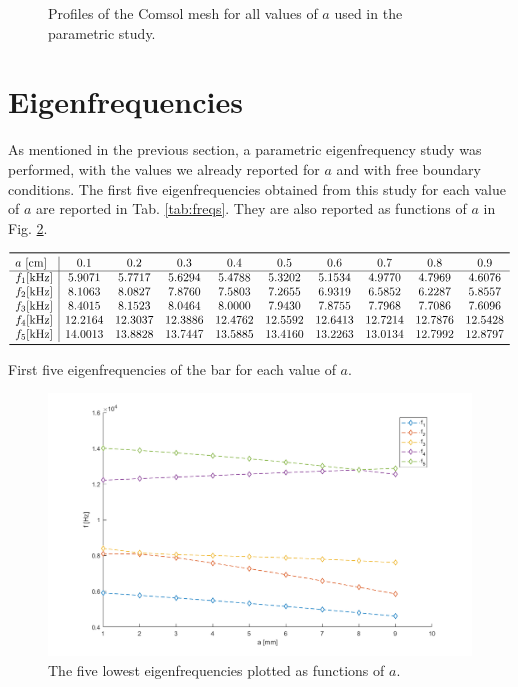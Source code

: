 \documentclass[a4paper]{article}
\begin{document}
\begin{figure}[h]
\begin{subfigure}{0.22\linewidth}
	\end{subfigure}
	\caption{Profiles of the Comsol mesh for all values of $a$ used in the parametric study.}
	\label{fig:mesh}
\end{figure}

\section{Eigenfrequencies}
As mentioned in the previous section, a parametric eigenfrequency study was performed, with the values we already reported for $a$ and with free boundary conditions. The first five eigenfrequencies obtained from this study for each value of $a$ are reported in Tab. \ref{tab:freqs}. They are also reported as functions of $a$ in Fig. \ref{fig:freqz}.

\begin{table}[h]
	\centering
	$\begin{array}{l|ccccccccc}
		\toprule
		 a~[\si{\centi\meter}] & 0.1 & 0.2 & 0.3 & 0.4 & 0.5 & 0.6 & 0.7 & 0.8 & 0.9\\
		 \hline
		 f_1[\si{\kilo\hertz}]&5.9071  &  5.7717  &  5.6294  &  5.4788   & 5.3202 &   5.1534  &  4.9770  &  4.7969   & 4.6076\\
		 f_2[\si{\kilo\hertz}]&8.1063   & 8.0827 &   7.8760  &  7.5803  &  7.2655 &   6.9319  &  6.5852  &  6.2287 &   5.8557\\
		 f_3[\si{\kilo\hertz}]&8.4015  &  8.1523  &  8.0464  &  8.0000  &  7.9430 &   7.8755 &   7.7968  &  7.7086 &   7.6096\\
		 f_4[\si{\kilo\hertz}]&12.2164 &  12.3037 &  12.3886  & 12.4762 &  12.5592 &  12.6413 &  12.7214  & 12.7876 &   12.5428\\
		 f_5[\si{\kilo\hertz}]&14.0013  & 13.8828 &  13.7447  & 13.5885  & 13.4160&   13.2263 &  13.0134 &  12.7992 &  12.8797\\
		 \bottomrule
	\end{array}$
	\caption{First five eigenfrequencies of the bar for each value of $a$.}
	\label{tab:freqs}
\end{table}

\begin{figure}[h]
	\centering
	\includegraphics[width=0.85\linewidth]{freqz.png}
	\caption{The five lowest eigenfrequencies plotted as functions of $a$.}
	\label{fig:freqz}
\end{figure}
\end{document}
